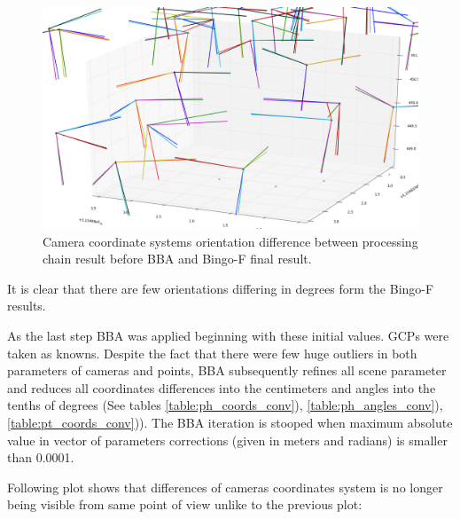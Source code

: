 \documentclass[a4paper,12pt]{article}
\begin{document}

\begin{center}
 \begin{figure}[!h]
    \includegraphics[scale=0.28]{figures/angles_comaprison_relative_orinetaion.png}
     \caption{Camera coordinate systems orientation difference between processing chain result before BBA and Bingo-F final result.}
    \label{fig:cam_diff_bef_bba}
\end{figure}
\end{center}

It is clear that there are few orientations differing in  degrees form the Bingo-F results. 

As the last step BBA was applied beginning with these initial values.
GCPs were taken as knowns.
Despite the fact that there were few huge outliers in both parameters of cameras and points,
BBA subsequently refines all scene parameter and reduces all coordinates 
differences into the centimeters and angles into the tenths of degrees (See tables \ref{table:ph_coords_conv}),
\ref{table:ph_angles_conv}), \ref{table:pt_coords_conv})). 
The BBA iteration is stooped when maximum absolute value in vector of parameters corrections (given in meters and radians) is
smaller than 0.0001.


Following plot shows that differences of cameras coordinates system is no longer being visible from same point of view
unlike to the previous plot:
\end{document}
